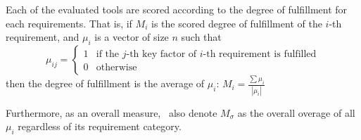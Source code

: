 


Each of the evaluated tools are scored according to the degree of fulfillment for each requirements.
That is, if $M_i$ is the scored degree of fulfillment of the $i$-th requirement, and $\mu_{i}$ is a vector of size $n$ such that
\[
    \mu_{ij} =
    \begin{cases}
        1 & \text{if the $j$-th key factor of $i$-th requirement is fulfilled} \\
        0 & \text{otherwise}
    \end{cases}
\]
then the degree of fulfillment is the average of $\mu_i$:
\(
    M_i = \frac{\sum\mu_{i}}{|\mu_i|}
\)

Furthermore, as an overall measure, \first~also denote $M_\sigma$ as the overall overage of all $\mu_{i}$ regardless of its requirement category.


